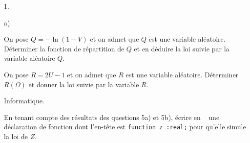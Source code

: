 \documentclass[11pt]{article}%
\begin{document}
\begin{noliste}{1.}
\begin{noliste}{a)}
 \setlength{\itemsep}{2mm}
\item On pose $Q = -\ln(1-V)$ et on admet que $Q$ est une variable
aléatoire.
Déterminer la fonction de répartition de $Q$ et en déduire la loi
suivie par
la variable aléatoire $Q.$

\item On pose $R = 2U-1$ et on admet que $R$ est une variable
aléatoire.
Déterminer $R(\Omega)$ et donner la loi suivie par la variable $R.$

\item Informatique.

En tenant compte des résultats des questions 5a) et 5b), écrire en
\texttt{ \Scilab{}} une déclaration de fonction dont l'en-tête est
\texttt{function z :real;} pour qu'elle simule la loi de $Z.$
\end{noliste}
\end{noliste}
\end{document}
